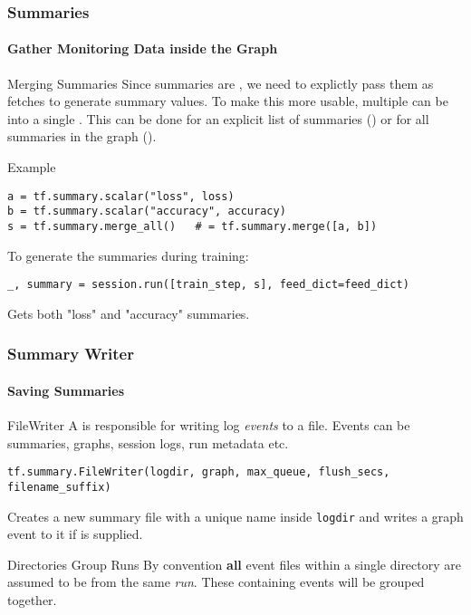 \begin{frame}[fragile]
	\frametitle{Summaries}
	\framesubtitle{Gather Monitoring Data inside the Graph}
	\begin{block}{Merging Summaries}
		Since summaries are , we need to explictly pass them as fetches to generate summary values.
		To make this more usable, multiple  can be  into a single . 
		This can be done for an explicit list of summaries () or for all summaries in the graph
		().
	\end{block}
	\begin{block}{Example}
		\begin{lstlisting}
a = tf.summary.scalar("loss", loss)
b = tf.summary.scalar("accuracy", accuracy)
s = tf.summary.merge_all()   # = tf.summary.merge([a, b])
		\end{lstlisting}
		To generate the summaries during training:
		\begin{lstlisting}
_, summary = session.run([train_step, s], feed_dict=feed_dict)
		\end{lstlisting}
		Gets both "loss" and "accuracy" summaries.
	\end{block}
\end{frame}

\begin{frame}[fragile]
	\frametitle{Summary Writer}
	\framesubtitle{Saving Summaries}
	\begin{block}{FileWriter}
		A  is responsible for writing log \emph{events} to a file. 
		Events can be summaries, graphs, session logs, run metadata etc. 
		\begin{lstlisting}
tf.summary.FileWriter(logdir, graph, max_queue, flush_secs, filename_suffix)
		\end{lstlisting}
		Creates a new summary file with a unique name inside \texttt{logdir} and
		writes a graph event to it if  is supplied.
	\end{block}
	\begin{block}{Directories Group Runs}
	By convention \textbf{all} event files within a single directory are assumed to be from the same 
	\emph{run}. These containing events will be grouped together.
	\end{block}
\end{frame}


